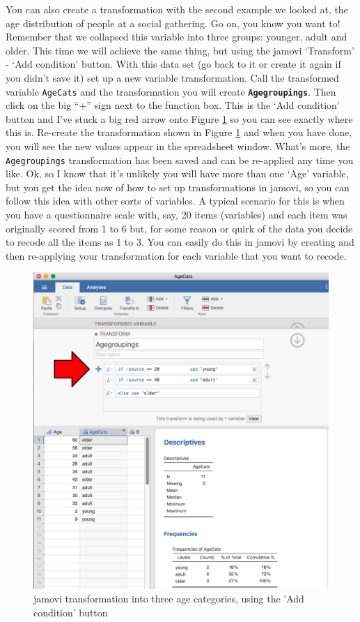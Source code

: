 \documentclass[
]{book}
\begin{document}
You can also create a transformation with the second example we looked at, the age distribution of people at a social gathering. Go on, you know you want to! Remember that we collapsed this variable into three groups: younger, adult and older. This time we will achieve the same thing, but using the jamovi `Transform' - `Add condition' button. With this data set (go back to it or create it again if you didn't save it) set up a new variable transformation. Call the transformed variable \texttt{AgeCats} and the transformation you will create \textbf{\texttt{Agegroupings}}. Then click on the big ``+'' sign next to the function box. This is the `Add condition' button and I've stuck a big red arrow onto Figure \ref{fig:transform3} so you can see exactly where this is. Re-create the transformation shown in Figure \ref{fig:transform3} and when you have done, you will see the new values appear in the spreadsheet window. What's more, the \texttt{Agegroupings} transformation has been saved and can be re-applied any time you like. Ok, so I know that it's unlikely you will have more than one `Age' variable, but you get the idea now of how to set up transformations in jamovi, so you can follow this idea with other sorts of variables. A typical scenario for this is when you have a questionnaire scale with, say, 20 items (variables) and each item was originally scored from 1 to 6 but, for some reason or quirk of the data you decide to recode all the items as 1 to 3. You can easily do this in jamovi by creating and then re-applying your transformation for each variable that you want to recode.

\begin{figure}

{\centering \includegraphics[width=1\linewidth]{img/mechanics/transform3} 

}

\caption{jamovi transformation into three age categories, using the 'Add condition' button}\label{fig:transform3}
\end{figure}
\end{document}
